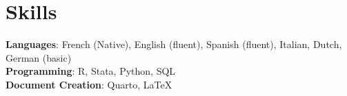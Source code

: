 \documentclass[12pt]{article}
\makeatletter
\newcommand{\CVSubheading}[4]{
  \vspace{-2pt}\item
    \begin{tabular*}{0.97\textwidth}[t]{l@{\extracolsep{\fill}}r}
      \textbf{#1} & #2 \\
      \small#3 & \small #4 \\
    \end{tabular*}\vspace{-7pt}
}
\newcommand{\CVSubHeadingListStart}{\begin{itemize}[leftmargin=0.5cm, label={}]}
\newcommand{\CVSubHeadingListEnd}{\end{itemize}}
\makeatother
\begin{document}



%


\section{Skills}
 \begin{itemize}[leftmargin=0.5cm, label={}]
    \small{\item{
     \textbf{Languages}{: French (Native), English (fluent), Spanish (fluent), Italian, Dutch, German (basic)} \\
     \textbf{Programming}{: R, Stata, Python, SQL} \\
     \textbf{Document Creation}{: Quarto, \LaTeX{}} 
    }}
 \end{itemize}
    
\end{document}
